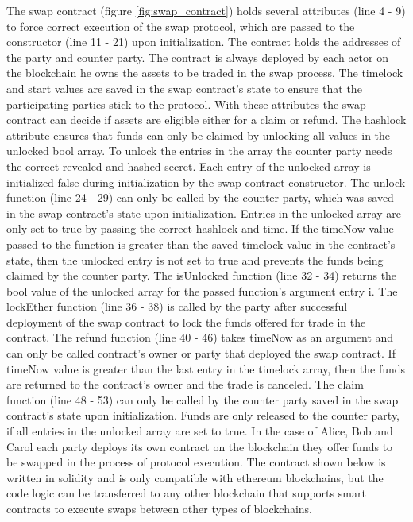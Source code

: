 The swap contract (figure \ref{fig:swap_contract}) holds several attributes (line 4 - 9) to force correct execution of the swap protocol, which are passed to the constructor (line 11 - 21) upon initialization. The contract holds the addresses of the party and counter party. The contract is always deployed by each actor on the blockchain he owns the assets to be traded in the swap process. The timelock and start values are saved in the swap contract's state to ensure that the participating parties stick to the protocol. With these attributes the swap contract can decide if assets are eligible either for a claim or refund. The hashlock attribute ensures that funds can only be claimed by unlocking all values in the unlocked bool array. To unlock the entries in the array the counter party needs the correct revealed and hashed secret. Each entry of the unlocked array is initialized false during initialization by the swap contract constructor. The unlock function (line 24 - 29) can only be called by the counter party, which was saved in the swap contract's state upon initialization. Entries in the unlocked array are only set to true by passing the correct hashlock and time. If the timeNow value passed to the function is greater than the saved timelock value in the contract's state, then the unlocked entry is not set to true and prevents the funds being claimed by the counter party. The isUnlocked function (line 32 - 34) returns the bool value of the unlocked array for the passed function's argument entry i. The lockEther function (line 36 - 38) is called by the party after successful deployment of the swap contract to lock the funds offered for trade in the contract. The refund function (line 40 - 46) takes timeNow as an argument and can only be called contract's owner or party that deployed the swap contract. If timeNow value is greater than the last entry in the timelock array, then the funds are returned to the contract's owner and the trade is canceled. The claim function (line 48 - 53) can only be called by the counter party saved in the swap contract's state upon initialization. Funds are only released to the counter party, if all entries in the unlocked array are set to true. In the case of Alice, Bob and Carol each party deploys its own contract on the blockchain they offer funds to be swapped in the process of protocol execution. The contract shown below is written in solidity and is only compatible with ethereum blockchains, but the code logic can be transferred to any other blockchain that supports smart contracts to execute swaps between other types of blockchains.


